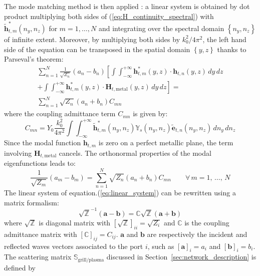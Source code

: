 The mode matching method is then applied \cite{berio1996}: a linear system is obtained by dot product multiplying both sides of (\ref{eq:H_continuity_spectral}) with $\tilde{\mathbf{h}}_{t,m}^{*}\left(n_{y},n_{z}\right)$ for $m=1,\ldots,N$ and integrating over the spectral domain $\left\{ n_{y},n_{z}\right\} $ of infinite extent. Moreover, by multiplying both sides by $k_{0}^{2}/4\pi^{2}$, the left hand side of the equation can be transposed in the spatial domain $\left\{ y,z\right\} $ thanks to Parseval's theorem:
\begin{eqnarray}
\sum_{n=1}^{N}\frac{1}{\sqrt{Z_{n}}}\left(a_{n}-b_{n}\right)\left[\int\int_{-\infty}^{+\infty}\!\mathbf{h}_{t,m}^{*}\left(y,z\right)\cdot\mathbf{h}_{t,n}\left(y,z\right)\, dy\, dz\right.\\
\left.+\int\int_{-\infty}^{+\infty}\!\mathbf{h}_{t,m}^{*}\left(y,z\right)\cdot\mathbf{H}_{t,\mbox{metal}}\left(y,z\right)\, dy\, dz\right]=\nonumber \\
\sum_{n=1}^{N}\sqrt{Z_{n}}\left(a_{n}+b_{n}\right)C_{mn}\nonumber 
\end{eqnarray}
where the coupling admittance term $C_{mn}$ is given by:
\begin{equation}
C_{mn}=Y_{0}\frac{k_{0}^{2}}{4\pi^{2}}\int\int_{-\infty}^{+\infty}\tilde{\mathbf{h}}_{t,m}^{*}\left(n_{y},n_{z}\right)\mathbb{Y}_{s}\left(n_{y},n_{z}\right)\tilde{\mathbf{e}}_{t,n}\left(n_{y},n_{z}\right)\, dn_{y}\, dn_{z}\label{eq:coupling_admittance}
\end{equation}
Since the modal function $\mathbf{h}_{t,m}$ is zero on a perfect metallic plane, the term involving $\mathbf{H}_{t,\mbox{metal}}$ cancels. The orthonormal properties of the modal eigenfunctions\cite{Collin1990,Harrington2001}
leads to:
\begin{equation}
\frac{1}{\sqrt{Z_{m}}}\left(a_{m}-b_{m}\right)=\sum_{n=1}^{N}\sqrt{Z_{n}}\left(a_{n}+b_{n}\right)C_{mn}\qquad\forall\, m=1,\,\ldots,\, N\label{eq:linear_system}
\end{equation}
The linear system of equation.(\ref{eq:linear_system}) can be rewritten
using a matrix formalism:
\begin{equation}
\sqrt{\mathbb{Z}}^{-1}\left(\mathbf{a}-\mathbf{b}\right)=\mathbb{C}\sqrt{\mathbb{Z}}\left(\mathbf{a}+\mathbf{b}\right)\label{eq:linear_system_matrix}
\end{equation}
where $\sqrt{\mathbb{Z}}$ is diagonal matrix with $\left[\sqrt{\mathbb{Z}}\right]_{ii}=\sqrt{Z_{i}}$ and $\mathbb{C}$ is the coupling admittance matrix with $\left[\mathbb{C}\right]_{ij}=C_{ij}$. $\mathbf{a}$ and $\mathbf{b}$ are respectively the incident and reflected waves vectors associated to the port $i$, such as $\left[\mathbf{a}\right]_{i}=a_{i}$ and $\left[\mathbf{b}\right]_{i}=b_{i}$. The scattering matrix $\mathbb{S}_{\mbox{grill/plasma}}$ discussed in Section~\ref{sec:network_description} is defined by

